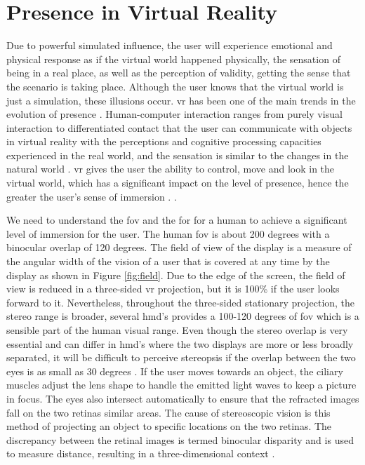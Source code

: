 \section{Presence in Virtual Reality} 
Due to powerful simulated influence, the user will experience emotional and physical response as if the virtual world happened physically, the sensation of being in a real place, as well as the perception of validity, getting the sense that the scenario is taking place. Although the user knows that the virtual world is just a simulation, these illusions occur. \acrshort{vr} has been one of the main trends in the evolution of presence \citep{Waterworth2014, Steinicke2016}.
Human-computer interaction ranges from purely visual interaction to differentiated contact that the user can communicate with objects in virtual reality with the perceptions and cognitive processing capacities experienced in the real world, and the sensation is similar to the changes in the natural world \citep{Hu2016}.
\acrshort{vr} gives the user the ability to control, move and look in the virtual world, which has a significant impact on the level of presence, hence the greater the user's sense of immersion \citep{William}. \cite[p.4]{Waterworth2014}.


We need to understand the \acrfull{fov} and the \acrfull{for} for a human to achieve a significant level of immersion for the user. The human \acrshort{fov} is about 200 degrees with a binocular overlap of 120 degrees. The field of view of the display is a measure of the angular width of the vision of a user that is covered at any time by the display as shown in Figure \ref{fig:field}. Due to the edge of the screen, the field of view is reduced in a three-sided \acrshort{vr} projection, but it is 100\% if the user looks forward to it. Nevertheless, throughout the three-sided stationary projection, the stereo range is broader, several \acrlong{hmd}'s provides a 100-120 degrees of \acrshort{fov} which is a sensible part of the human visual range. Even though the stereo overlap is very essential and can differ in \acrshort{hmd}'s where the two displays are more or less broadly separated, it will be difficult to perceive stereopsis if the overlap between the two eyes is as small as 30 degrees \citep{William}.
If the user moves towards an object, the ciliary muscles adjust the lens shape to handle the emitted light waves to keep a picture in focus. The eyes also intersect automatically to ensure that the refracted images fall on the two retinas similar areas. The cause of stereoscopic vision is this method of projecting an object to specific locations on the two retinas. The discrepancy between the retinal images is termed binocular disparity and is used to measure distance, resulting in a three-dimensional context \citep{Vince2011}.

